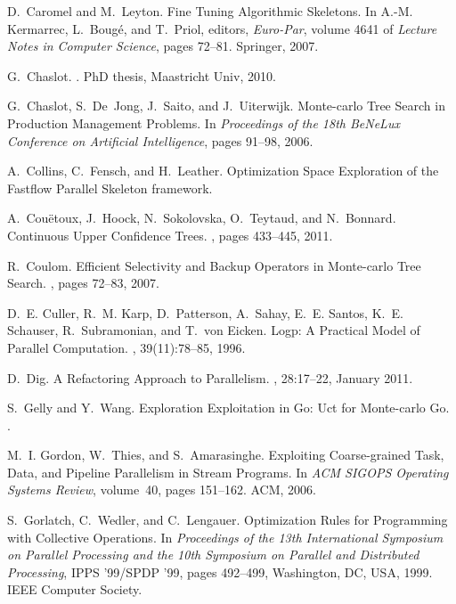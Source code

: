 \documentclass[smallextended]{svjour3}
\begin{document}
\begin{thebibliography}{10}
D.~Caromel and M.~Leyton.
\newblock Fine Tuning Algorithmic Skeletons.
\newblock In A.-M. Kermarrec, L.~Boug{\'e}, and T.~Priol, editors, {\em
  Euro-Par}, volume 4641 of {\em Lecture Notes in Computer Science}, pages
  72--81. Springer, 2007.

G.~Chaslot.
.
\newblock PhD thesis, Maastricht Univ, 2010.

G.~Chaslot, S.~De~Jong, J.~Saito, and J.~Uiterwijk.
\newblock Monte-carlo Tree Search in Production Management Problems.
\newblock In {\em Proceedings of the 18th BeNeLux Conference on Artificial
  Intelligence}, pages 91--98, 2006.

A.~Collins, C.~Fensch, and H.~Leather.
\newblock Optimization Space Exploration of the Fastflow Parallel Skeleton
  framework.

A.~Cou{\"e}toux, J.~Hoock, N.~Sokolovska, O.~Teytaud, and N.~Bonnard.
\newblock Continuous Upper Confidence Trees.
, pages 433--445, 2011.

R.~Coulom.
\newblock Efficient Selectivity and Backup Operators in Monte-carlo Tree
  Search.
, pages 72--83, 2007.

D.~E. Culler, R.~M. Karp, D.~Patterson, A.~Sahay, E.~E. Santos, K.~E. Schauser,
  R.~Subramonian, and T.~von Eicken.
\newblock Logp: A Practical Model of Parallel Computation.
, 39(11):78--85, 1996.

D.~Dig.
\newblock A {R}efactoring {A}pproach to {P}arallelism.
, 28:17--22, January 2011.

S.~Gelly and Y.~Wang.
\newblock Exploration Exploitation in Go: Uct for Monte-carlo Go.
.

M.~I. Gordon, W.~Thies, and S.~Amarasinghe.
\newblock Exploiting Coarse-grained Task, Data, and Pipeline Parallelism in
  Stream Programs.
\newblock In {\em ACM SIGOPS Operating Systems Review}, volume~40, pages
  151--162. ACM, 2006.

S.~Gorlatch, C.~Wedler, and C.~Lengauer.
\newblock Optimization {R}ules for {P}rogramming with {C}ollective
  {O}perations.
\newblock In {\em Proceedings of the 13th International Symposium on Parallel
  Processing and the 10th Symposium on Parallel and Distributed Processing},
  IPPS '99/SPDP '99, pages 492--499, Washington, DC, USA, 1999. IEEE Computer
  Society.


\end{thebibliography}
\end{document}
